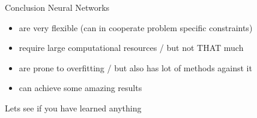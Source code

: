 \documentclass{beamer}
\begin{document}
\begin{frame}[t]{Conclusion}
  Neural Networks
  \begin{itemize}
    \item are very flexible (can in cooperate problem specific constraints)
    \item require large computational resources / but not THAT much
    \item are prone to overfitting / but also has lot of methods against it
    \item can achieve some amazing results
  \end{itemize}
\end{frame}

\begin{frame}[c, plain]{}
  \begin{center}
    Lets see if you have learned anything
  \end{center}
\end{frame}
\end{document}
